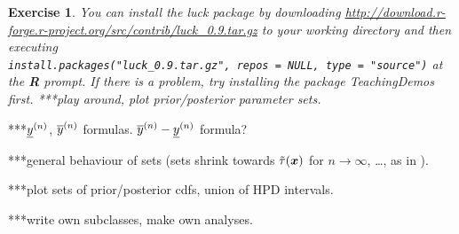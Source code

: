 \documentclass[12pt,a4paper	,twoside]{article}
\newcommand{\bs}[1]{\boldsymbol{#1}}
\renewcommand{\vec}[1]{{\bs#1}}
\newcommand{\code}[1]{\emph{\ttfamily #1}}
\newtheorem{myex}{Exercise}
\begin{document}
\begin{myex}
You can install the \code{luck} package 
by downloading \emph{\url{http://download.r-forge.r-project.org/src/contrib/luck_0.9.tar.gz}}
to your working directory and then executing\\
\verb+install.packages("luck_0.9.tar.gz", repos = NULL, type = "source")+
at the \textbf{R} prompt.
If there is a problem, try installing the package \code{TeachingDemos} first.
***play around, plot prior/posterior parameter sets.
\end{myex}

***$\underline{y}^{(n)}$, $\overline{y}^{(n)}$ formulas. $\overline{y}^{(n)}-\underline{y}^{(n)}$ formula? \parencite[p.~65]{2013:diss-gw}

***general behaviour of sets
(sets shrink towards $\ttau(\vec{x})$ for $n \to \infty$, \dots, as in \parencite[\S 3.1.2]{2013:diss-gw}).

***plot sets of prior/posterior cdfs, union of HPD intervals.

***write own subclasses, make own analyses.




\printbibliography
\end{document}
